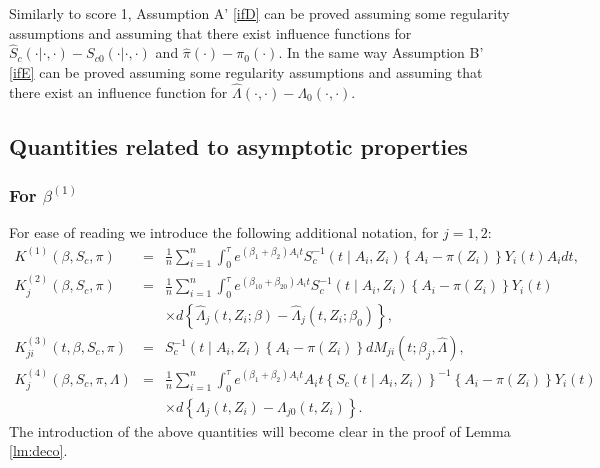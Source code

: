 \documentclass[11pt]{article}
\newcommand{\ee}{\end{eqnarray}}
\newcommand{\be}{\begin{eqnarray}}
\begin{document}
\begin{remark}
Similarly to score 1, Assumption A' \ref{ifD} can be proved assuming some regularity assumptions and assuming that there exist influence functions for  $\hat S_c(\cdot | \cdot,\cdot)-S_{c0}(\cdot | \cdot,\cdot)$  and $\hat \pi(\cdot)-\pi_0(\cdot)$.
In the same way Assumption B' \ref{ifE} can be proved assuming some regularity assumptions and assuming that there exist an influence function for  $\hat \Lambda(\cdot,\cdot)-\Lambda_0(\cdot,\cdot)$.
\end{remark}






\subsection{Quantities related to asymptotic properties}\label{tq}


\subsubsection{For $\beta^{(1)}$}

For ease of reading we introduce the following additional notation, for $j=1, 2$: 
\be\label{K1}
K^{(1)}(\beta, S_c, \pi)&=&\frac{1}{n}\sum_{i=1}^n\int_0^\tau e^{ (\beta_1  + \beta_2) A_i t}S^{-1}_c(t \mid A_i,Z_i)\left\{A_i -\pi( Z_i)\right\}Y_i(t)A_idt, \\
\label{K2}
K^{(2)}_j(\beta,S_c, \pi)&=&\frac{1}{n}\sum_{i=1}^n\int_0^\tau e^{ (\beta_{10}  + \beta_{20}) A_i t}S^{-1}_c(t \mid A_i,Z_i)\left\{A_i -\pi( Z_i)\right\}Y_i(t)
\nonumber\\
&&\times d\left\{\hat \Lambda_{j}(t, Z_i ; \beta)-\hat \Lambda_{j}(t, Z_i ; \beta_0)\right\},\\
\label{K3}
K^{(3)}_{ji}(t, \beta, S_c, \pi)&=& S^{-1}_c(t \mid A_i,Z_i)\left\{A_i -\pi( Z_i)\right\}dM_{ji}(t ; \beta_j, \hat\Lambda),\\
\label{K4}
K^{(4)}_j(\beta, S_c, \pi, \Lambda)&=&\frac{1}{n}\sum_{i=1}^n\int_0^\tau e^{ (\beta_{1}  + \beta_{2})A_i t}A_i t \left\{S_c(t \mid A_i,Z_i)\right\}^{-1}\left\{A_i -\pi( Z_i)\right\}Y_i(t)
\nonumber\\
&&\times d\left\{\Lambda_j(t,Z_i)-\Lambda_{j0}(t,Z_i)\right\}.
\ee
The introduction of the above quantities will become clear  in the proof of Lemma \ref{lm:deco}.
\end{document}
